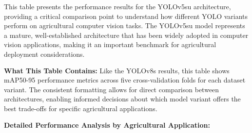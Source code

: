 This table presents the performance results for the YOLOv5su architecture, providing a critical comparison point to understand how different YOLO variants perform on agricultural computer vision tasks. The YOLOv5su model represents a mature, well-established architecture that has been widely adopted in computer vision applications, making it an important benchmark for agricultural deployment considerations.

\textbf{What This Table Contains:} Like the YOLOv8s results, this table shows mAP50-95 performance metrics across five cross-validation folds for each dataset variant. The consistent formatting allows for direct comparison between architectures, enabling informed decisions about which model variant offers the best trade-offs for specific agricultural applications.

\textbf{Detailed Performance Analysis by Agricultural Application:}


